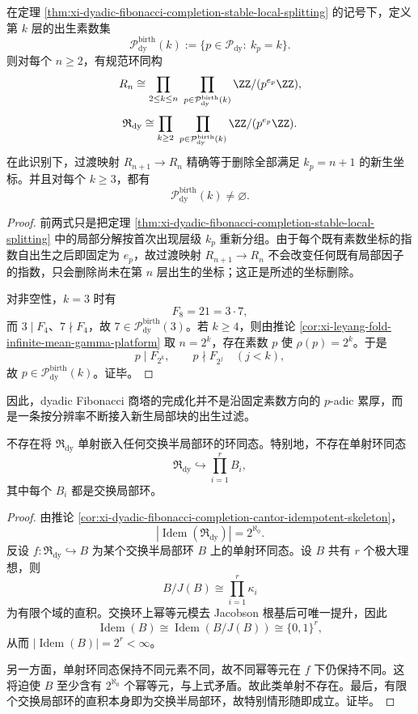 \begin{theorem}\label{thm:xi-dyadic-fibonacci-completion-birth-filtration}
在定理 \ref{thm:xi-dyadic-fibonacci-completion-stable-local-splitting} 的记号下，定义第 \(k\) 层的出生素数集
\[
\mathcal P_{\mathrm{dy}}^{\mathrm{birth}}(k)
:=
\{p\in\mathcal P_{\mathrm{dy}}:\ k_p=k\}.
\]
则对每个 \(n\ge 2\)，有规范环同构
\[
R_n
\cong
\prod_{2\le k\le n}\ \prod_{p\in\mathcal P_{\mathrm{dy}}^{\mathrm{birth}}(k)}
\ZZ/(p^{e_p}\ZZ),
\]
\[
\mathfrak R_{\mathrm{dy}}
\cong
\prod_{k\ge 2}\ \prod_{p\in\mathcal P_{\mathrm{dy}}^{\mathrm{birth}}(k)}
\ZZ/(p^{e_p}\ZZ).
\]
在此识别下，过渡映射 \(R_{n+1}\to R_n\) 精确等于删除全部满足 \(k_p=n+1\) 的新生坐标。并且对每个 \(k\ge 3\)，都有
\[
\mathcal P_{\mathrm{dy}}^{\mathrm{birth}}(k)\neq \varnothing.
\]
\end{theorem}
\begin{proof}
前两式只是把定理 \ref{thm:xi-dyadic-fibonacci-completion-stable-local-splitting} 中的局部分解按首次出现层级 \(k_p\) 重新分组。由于每个既有素数坐标的指数自出生之后即固定为 \(e_p\)，故过渡映射 \(R_{n+1}\to R_n\) 不会改变任何既有局部因子的指数，只会删除尚未在第 \(n\) 层出生的坐标；这正是所述的坐标删除。

对非空性，\(k=3\) 时有
\[
F_8=21=3\cdot 7,
\]
而 \(3\mid F_4\)、\(7\nmid F_4\)，故 \(7\in\mathcal P_{\mathrm{dy}}^{\mathrm{birth}}(3)\)。若 \(k\ge 4\)，则由推论 \ref{cor:xi-leyang-fold-infinite-mean-gamma-platform} 取 \(n=2^k\)，存在素数 \(p\) 使 \(\rho(p)=2^k\)。于是
\[
p\mid F_{2^k},
\qquad
p\nmid F_{2^j}\quad(j<k),
\]
故 \(p\in\mathcal P_{\mathrm{dy}}^{\mathrm{birth}}(k)\)。证毕。
\end{proof}

因此，dyadic Fibonacci 商塔的完成化并不是沿固定素数方向的 \(p\)-adic 累厚，而是一条按分辨率不断接入新生局部块的出生过滤。

\begin{theorem}[有限局部扇区上的忠实压缩不可能性]\label{thm:xi-dyadic-fibonacci-completion-no-semilocal-embedding}
不存在将 \(\mathfrak R_{\mathrm{dy}}\) 单射嵌入任何交换半局部环的环同态。特别地，不存在单射环同态
\[
\mathfrak R_{\mathrm{dy}}
\hookrightarrow
\prod_{i=1}^{r}B_i,
\]
其中每个 \(B_i\) 都是交换局部环。
\end{theorem}
\begin{proof}
由推论 \ref{cor:xi-dyadic-fibonacci-completion-cantor-idempotent-skeleton}，
\[
\left|\operatorname{Idem}(\mathfrak R_{\mathrm{dy}})\right|=2^{\aleph_0}.
\]
反设 \(f:\mathfrak R_{\mathrm{dy}}\hookrightarrow B\) 为某个交换半局部环 \(B\) 上的单射环同态。设 \(B\) 共有 \(r\) 个极大理想，则
\[
B/J(B)\cong \prod_{i=1}^{r}\kappa_i
\]
为有限个域的直积。交换环上幂等元模去 Jacobson 根基后可唯一提升，因此
\[
\operatorname{Idem}(B)\cong \operatorname{Idem}(B/J(B))
\cong
\{0,1\}^{r},
\]
从而 \(|\operatorname{Idem}(B)|=2^r<\infty\)。

另一方面，单射环同态保持不同元素不同，故不同幂等元在 \(f\) 下仍保持不同。这将迫使 \(B\) 至少含有 \(2^{\aleph_0}\) 个幂等元，与上式矛盾。故此类单射不存在。最后，有限个交换局部环的直积本身即为交换半局部环，故特别情形随即成立。证毕。
\end{proof}

